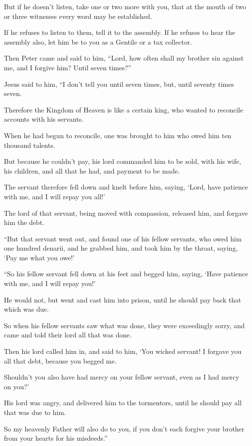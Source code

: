 But if he doesn’t listen, take one or two more with you, that at the mouth of two or three witnesses every word may be established.

If he refuses to listen to them, tell it to the assembly. If he refuses to hear the assembly also, let him be to you as a Gentile or a tax collector.

Then Peter came and said to him, “Lord, how often shall my brother sin against me, and I forgive him? Until seven times?”

Jesus said to him, “I don’t tell you until seven times, but, until seventy times seven.

Therefore the Kingdom of Heaven is like a certain king, who wanted to reconcile accounts with his servants.

When he had begun to reconcile, one was brought to him who owed him ten thousand talents.

But because he couldn’t pay, his lord commanded him to be sold, with his wife, his children, and all that he had, and payment to be made.

The servant therefore fell down and knelt before him, saying, ‘Lord, have patience with me, and I will repay you all!’

The lord of that servant, being moved with compassion, released him, and forgave him the debt.

“But that servant went out, and found one of his fellow servants, who owed him one hundred denarii, and he grabbed him, and took him by the throat, saying, ‘Pay me what you owe!’

“So his fellow servant fell down at his feet and begged him, saying, ‘Have patience with me, and I will repay you!’

He would not, but went and cast him into prison, until he should pay back that which was due.

So when his fellow servants saw what was done, they were exceedingly sorry, and came and told their lord all that was done.

Then his lord called him in, and said to him, ‘You wicked servant! I forgave you all that debt, because you begged me.

Shouldn’t you also have had mercy on your fellow servant, even as I had mercy on you?’

His lord was angry, and delivered him to the tormentors, until he should pay all that was due to him.

So my heavenly Father will also do to you, if you don’t each forgive your brother from your hearts for his misdeeds.”

